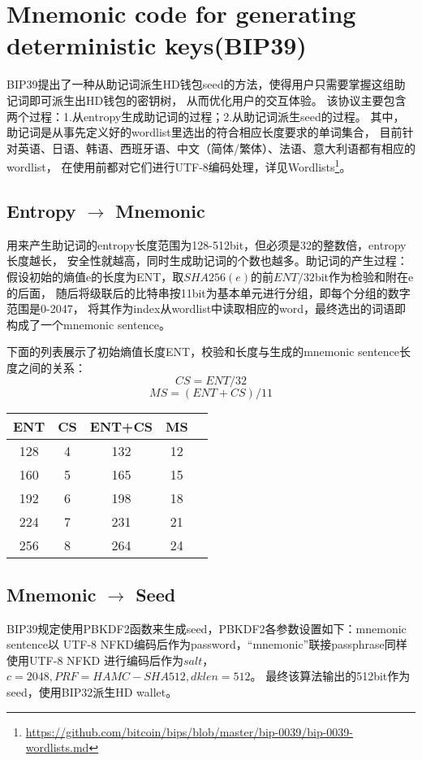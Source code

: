\section{Mnemonic code for generating deterministic keys(BIP39)}
BIP39提出了一种从助记词派生HD钱包seed的方法，使得用户只需要掌握这组助记词即可派生出HD钱包的密钥树，
从而优化用户的交互体验。  
该协议主要包含两个过程：1.从entropy生成助记词的过程；2.从助记词派生seed的过程。
其中，助记词是从事先定义好的wordlist里选出的符合相应长度要求的单词集合，
目前针对英语、日语、韩语、西班牙语、中文（简体/繁体）、法语、意大利语都有相应的wordlist，
在使用前都对它们进行UTF-8编码处理，详见Wordlists\footnote{\url{https://github.com/bitcoin/bips/blob/master/bip-0039/bip-0039-wordlists.md}}。


\subsection{Entropy $\rightarrow$ Mnemonic}
用来产生助记词的entropy长度范围为128-512bit，但必须是32的整数倍，entropy长度越长，
安全性就越高，同时生成助记词的个数也越多。助记词的产生过程：
假设初始的熵值e的长度为ENT，取$SHA256(e)$的前$ENT/32$bit作为检验和附在e的后面，
随后将级联后的比特串按11bit为基本单元进行分组，即每个分组的数字范围是0-2047，
将其作为index从wordlist中读取相应的word，最终选出的词语即构成了一个mnemonic sentence。

下面的列表展示了初始熵值长度ENT，校验和长度与生成的mnemonic sentence长度之间的关系：
		$$CS = ENT / 32$$
		$$MS = (ENT + CS) / 11$$
\begin{table}
\centering
\begin{tabular}{|c|c|c|c|c|}
\hline
\small
ENT &  CS  &   ENT+CS  &  MS  \\\hline
128 &  4  &  132 &  12  \\\hline
160 &  5  &  165 &  15 \\\hline
192 &  6  &  198 &  18 \\\hline
224  &  7  &  231 &  21 \\\hline
256  &  8  &  264 &  24 \\\hline
\end{tabular}
\end{table}

\subsection{Mnemonic $\rightarrow$ Seed}
BIP39规定使用PBKDF2函数来生成seed，PBKDF2各参数设置如下：mnemonic sentence以 UTF-8 NFKD编码后作为password，“mnemonic”联接passphrase同样使用UTF-8 NFKD
进行编码后作为$salt$，$c=2048, PRF=HAMC-SHA512, dklen=512$。
最终该算法输出的512bit作为 seed，使用BIP32派生HD wallet。


